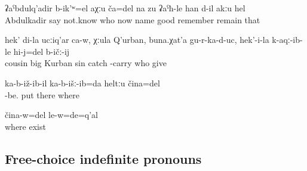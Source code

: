 \begin{exe}
	\ex	\label{ex:He was called Abdukhaliq or something (lit. somebody), I don't know, I don't remember this name well}
	\gll	ʡaˁbdulq'adir	b-ik'ʷ=el	aχːu	ča=del	na	zu	ʡaˁħ-le	han	d-il	akːu	hel\\
		Abdulkadir	say	not.know	who	now	name	good	remember	remain		that\\
	\glt	{}

	\ex	\label{ex:My cousin, Old Kurban, may his sins be relieved, brought them for me to give them to someone}
	\gll	hek'	di-la	ucːiq'ar ca-w,	χːula	Q'urban,	buna.χat'a	gu-r-ka-d-uc,		hek'-i-la	k-aqː-ib-le	hi-j=del	b-ičː-ij\\
				cousin		big	Kurban	sin	catch			-carry	who	give\\
	\glt	{}
	
	\ex	\label{ex:I put (the picture) somewhere}
	\gll	ka-b-iž-ib-il	ka-b-išː-ib=da	heltːu	čina=del\\
		-be.	put	there	where\\
	\glt	{}

	\ex	\label{ex:He was somewhere}
	\gll	čina-w=del	le-w=de=q'al\\
		where	exist\\
	\glt	{}


\end{exe}



\subsection{Free-choice indefinite pronouns}
\label{ssec:Free-choice indefinite pronouns}

